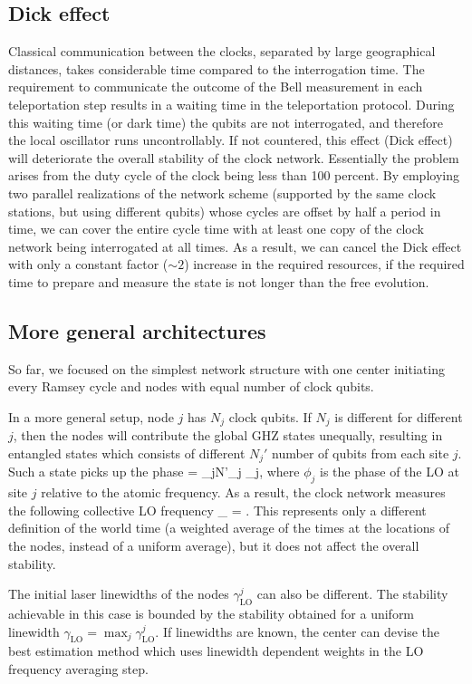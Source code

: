 \subsection{Dick effect}
Classical communication between the clocks, separated by large geographical
distances, takes considerable time compared to the interrogation time. The
requirement to communicate the outcome of the Bell measurement in each
teleportation step results in a waiting time in the teleportation protocol.
During this waiting time (or dark time) the qubits are not interrogated, and
therefore the local oscillator runs uncontrollably. If not countered, this
effect (Dick effect) will deteriorate the overall stability of the clock
network.
Essentially the problem arises from the duty cycle of the clock being less than
100 percent. By employing two parallel realizations of the network scheme
(supported by the same clock stations, but using different qubits) whose cycles
are offset by half a period in time, we can cover the entire cycle time with at
least one copy of the clock network being interrogated at all times. As a
result, we can cancel the Dick effect with only a constant factor ($\sim 2$) 
increase in the required resources, if the required time to prepare and measure
the state is not longer than the free evolution.


\subsection{More general architectures}
So far, we focused on the simplest network structure with one center
initiating every Ramsey cycle and nodes with equal number of clock qubits.

In a more general setup, node $j$ has $N_j$ clock qubits. If $N_j$ is different
for different $j$, then the nodes will contribute the global GHZ states
unequally, resulting in entangled states which consists of different $N_j'$
number of qubits from each site $j$. Such a state picks up the phase
\bel
	\Phi = \sum_{j}N'_j \phi_j,
\eel
where $\phi_j$ is the phase of the LO at site $j$ relative to the atomic
frequency. As a result, the clock network measures the following collective LO
frequency
\bel
	\nu_ = .
\eel
This represents only a different definition of the world time (a weighted
average of the times at the locations of the nodes, instead of a uniform
average), but it does not affect the overall stability.

The initial laser linewidths of the nodes $\gamma_\mathrm{LO}^j$ can also be
different. The stability achievable in this case is bounded by the stability
obtained for a uniform linewidth $\gamma_\mathrm{LO} = \max_j \gamma_\mathrm{LO}^j$.
If linewidths are known, the center can devise the best estimation method
which uses linewidth dependent weights in the LO frequency averaging step. 



